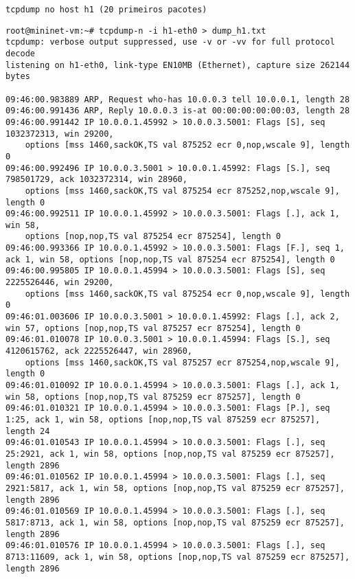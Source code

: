 \documentclass[12pt,letterpaper]{article}
\begin{document}
\begin{verbatim}
tcpdump no host h1 (20 primeiros pacotes)
\end{verbatim}

\begin{tiny}
\begin{verbatim}
root@mininet-vm:~# tcpdump-n -i h1-eth0 > dump_h1.txt
tcpdump: verbose output suppressed, use -v or -vv for full protocol decode
listening on h1-eth0, link-type EN10MB (Ethernet), capture size 262144 bytes

09:46:00.983889 ARP, Request who-has 10.0.0.3 tell 10.0.0.1, length 28
09:46:00.991436 ARP, Reply 10.0.0.3 is-at 00:00:00:00:00:03, length 28
09:46:00.991442 IP 10.0.0.1.45992 > 10.0.0.3.5001: Flags [S], seq 1032372313, win 29200,
    options [mss 1460,sackOK,TS val 875252 ecr 0,nop,wscale 9], length 0
09:46:00.992496 IP 10.0.0.3.5001 > 10.0.0.1.45992: Flags [S.], seq 798501729, ack 1032372314, win 28960,
    options [mss 1460,sackOK,TS val 875254 ecr 875252,nop,wscale 9], length 0
09:46:00.992511 IP 10.0.0.1.45992 > 10.0.0.3.5001: Flags [.], ack 1, win 58, 
    options [nop,nop,TS val 875254 ecr 875254], length 0
09:46:00.993366 IP 10.0.0.1.45992 > 10.0.0.3.5001: Flags [F.], seq 1, ack 1, win 58, options [nop,nop,TS val 875254 ecr 875254], length 0
09:46:00.995805 IP 10.0.0.1.45994 > 10.0.0.3.5001: Flags [S], seq 2225526446, win 29200,
    options [mss 1460,sackOK,TS val 875254 ecr 0,nop,wscale 9], length 0
09:46:01.003606 IP 10.0.0.3.5001 > 10.0.0.1.45992: Flags [.], ack 2, win 57, options [nop,nop,TS val 875257 ecr 875254], length 0
09:46:01.010078 IP 10.0.0.3.5001 > 10.0.0.1.45994: Flags [S.], seq 4120615762, ack 2225526447, win 28960,
    options [mss 1460,sackOK,TS val 875257 ecr 875254,nop,wscale 9], length 0
09:46:01.010092 IP 10.0.0.1.45994 > 10.0.0.3.5001: Flags [.], ack 1, win 58, options [nop,nop,TS val 875259 ecr 875257], length 0
09:46:01.010321 IP 10.0.0.1.45994 > 10.0.0.3.5001: Flags [P.], seq 1:25, ack 1, win 58, options [nop,nop,TS val 875259 ecr 875257], length 24
09:46:01.010543 IP 10.0.0.1.45994 > 10.0.0.3.5001: Flags [.], seq 25:2921, ack 1, win 58, options [nop,nop,TS val 875259 ecr 875257], length 2896
09:46:01.010562 IP 10.0.0.1.45994 > 10.0.0.3.5001: Flags [.], seq 2921:5817, ack 1, win 58, options [nop,nop,TS val 875259 ecr 875257], length 2896
09:46:01.010569 IP 10.0.0.1.45994 > 10.0.0.3.5001: Flags [.], seq 5817:8713, ack 1, win 58, options [nop,nop,TS val 875259 ecr 875257], length 2896
09:46:01.010576 IP 10.0.0.1.45994 > 10.0.0.3.5001: Flags [.], seq 8713:11609, ack 1, win 58, options [nop,nop,TS val 875259 ecr 875257], length 2896

\end{verbatim}
\end{tiny}
\end{document}
